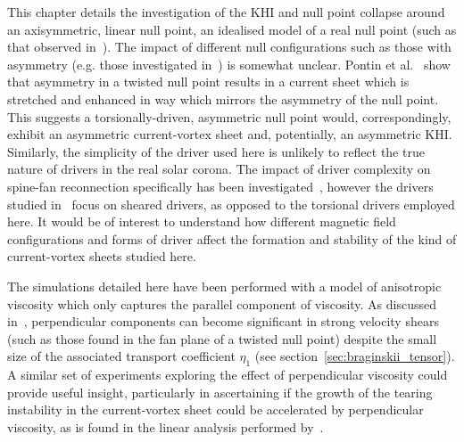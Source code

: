 This chapter details the investigation of the KHI and null point collapse around an axisymmetric, linear null point, an idealised model of a real null point (such as that observed in~\cite{massonNATUREFLARERIBBONS2009}). The impact of different null configurations such as those with asymmetry (e.g. those investigated in~\cite{thurgoodImplosiveCollapseMagnetic2018,pontinWhyAreFlare2016a}) is somewhat unclear. Pontin et al.~\cite{pontinGeneralisedModelsTorsional2011} show that asymmetry in a twisted null point results in a current sheet which is stretched and enhanced in way which mirrors the asymmetry of the null point. This suggests a torsionally-driven, asymmetric null point would, correspondingly, exhibit an asymmetric current-vortex sheet and, potentially, an asymmetric KHI. Similarly, the simplicity of the driver used here is unlikely to reflect the true nature of drivers in the real solar corona. The impact of driver complexity on spine-fan reconnection specifically has been investigated~\cite{wyperSpinefanReconnectionInfluence2012}, however the drivers studied in~\cite{wyperSpinefanReconnectionInfluence2012} focus on sheared drivers, as opposed to the torsional drivers employed here. It would be of interest to understand how different magnetic field configurations and forms of driver affect the formation and stability of the kind of current-vortex sheets studied here.

The simulations detailed here have been performed with a model of anisotropic viscosity which only captures the parallel component of viscosity. As discussed in~\cite{einaudiResistiveInstabilitiesFlowing1989}, perpendicular components can become significant in strong velocity shears (such as those found in the fan plane of a twisted null point) despite the small size of the associated transport coefficient $\eta_1$ (see section~\ref{sec:braginskii_tensor}). A similar set of experiments exploring the effect of perpendicular viscosity could provide useful insight, particularly in ascertaining if the growth of the tearing instability in the current-vortex sheet could be accelerated by perpendicular viscosity, as is found in the linear analysis performed by~\cite{einaudiResistiveInstabilitiesFlowing1989}.

